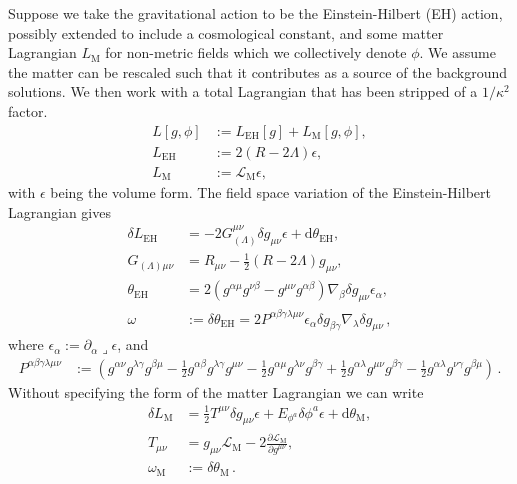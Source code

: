\documentclass[]{jkpaper}
\theoremstyle{plain}
\theoremstyle{definition}
\newcommand{\sins}{\mathop{\lrcorner}}
\newcommand{\sd}{\mathrm {d}}
\newcommand{\fd}{\delta}
\begin{document}
Suppose we take the gravitational action to be the Einstein-Hilbert (EH) action, possibly extended to include a cosmological constant, and some matter Lagrangian $L_{\text{M}}$ for non-metric fields which we collectively denote $\phi$.  We assume the matter can be rescaled such that it contributes as a source of the background solutions. We then work with a total Lagrangian that has been stripped of a $1/\kappa^2$ factor.
\begin{equation}\begin{split}\label{eq: Einstein Hilbert with matter system}
    L[g, \phi]&:=L_{\text{EH}}[g]+L_{\text{M}}[g,\phi],\\
    L_{\text{EH}}&:=2\left(R-2\Lambda \right)\epsilon,\\ L_{\text{M}}&:=\mathcal{L}_{\text{M}}\epsilon,
\end{split}\end{equation}
with $\epsilon$ being the volume form. The field space variation of the Einstein-Hilbert Lagrangian gives
\begin{equation}\begin{split}
    \fd L_{\text{EH}} &= -2G_{(\Lambda)}^{\mu\nu} \fd g_{\mu\nu}\epsilon +\sd \theta_{\text{EH}},\\
    G_{(\Lambda)\mu\nu}&=R_{\mu\nu}-\frac{1}{2}(R-2\Lambda)g_{\mu\nu},\\
    \theta_{\text{EH}}&=2\left(g^{\alpha\mu}g^{\nu\beta}-g^{\mu\nu}g^{\alpha\beta}\right)\nabla_{\beta}\delta g_{\mu\nu}\epsilon_\alpha,\\
    \omega &:=\fd\theta_{\text{EH}}= 2P^{\alpha\beta\gamma\lambda\mu\nu}\epsilon_\alpha \fd g_{\beta\gamma}\nabla_\lambda \fd g_{\mu\nu}\,,
\end{split}\end{equation}
where $\epsilon_\alpha:=\partial_\alpha\sins \epsilon$, and
\begin{equation}\begin{split}\label{eq: omega projector for GR}
    P^{\alpha\beta\gamma\lambda\mu\nu}&:=
    \left(g^{\alpha\nu}g^{\lambda\gamma}g^{\beta\mu}-\frac{1}{2}g^{\alpha\beta}g^{\lambda\gamma}g^{\mu\nu}-\frac{1}{2}g^{\alpha\mu}g^{\lambda\nu}g^{\beta\gamma}+\frac{1}{2}g^{\alpha\lambda}g^{\mu\nu}g^{\beta\gamma}-\frac{1}{2}g^{\alpha\lambda}g^{\nu\gamma}g^{\beta\mu}\right)\,.
\end{split}\end{equation}
Without specifying the form of the matter Lagrangian we can write
\begin{equation}\begin{split}
    \fd L_{\text{M}} &= \frac{1}{2}T^{\mu\nu}\fd g_{\mu\nu}\epsilon+ E_{\phi^a}  \fd\phi^a \epsilon +\sd\theta_{\text{M}},\\
    T_{\mu\nu}&=g_{\mu\nu}\mathcal{L}_{\text{M}} -2\frac{\partial\mathcal{L}_{\text{M}}}{\partial g^{\mu\nu}},\\
    \omega_{\text{M}}&:=\fd\theta_{\text{M}}\,.
\end{split}\end{equation}
\end{document}
